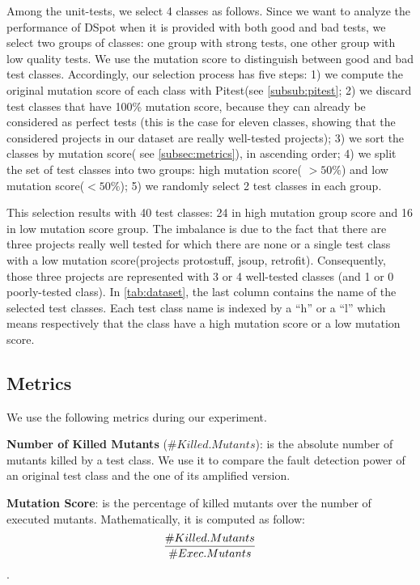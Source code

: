 \documentclass[table,xcdraw,smallextended]{svjour3}
\newcommand{\dspot}{DSpot\xspace}
\newcommand{\pitest}{Pitest\xspace}
\newcommand{\ms}{mutation score\xspace}
\begin{document}
Among the unit-tests, we select 4 classes as follows. Since we want to analyze the performance of \dspot{} when it is provided with both good and bad tests, we select two groups of classes: one group with strong tests, one other group with low quality tests.
We use the \ms to distinguish between good and bad test classes.
Accordingly, our selection process has five steps: 
1) we compute the original \ms of each class with \pitest (see \autoref{subsub:pitest};
2) we discard test classes that have 100\% \ms, because they can already be considered as perfect tests (this is the case for eleven classes, showing that the considered projects in our dataset are really well-tested projects);
3) we sort the classes by \ms ( see \autoref{subsec:metrics}), in ascending order;
4) we split the set of test classes into two groups: high \ms( $> 50\%$) and low \ms  ($< 50\%$);
5) we randomly select 2 test classes in each group.

This selection results with 40 test classes: 24 in high mutation group score and 16 in low \ms group. The imbalance is due to the fact that there are three projects really well tested for which there are none or a single test class with a low \ms (projects protostuff, jsoup, retrofit). Consequently, those three projects are represented with 3 or 4 well-tested classes (and 1 or 0 poorly-tested class). In \autoref{tab:dataset}, the last column contains the name of the selected test classes. Each test class name is indexed by a ``h'' or a ``l'' which means respectively that the class have a high \ms or a low \ms.


\subsection{Metrics}
\label{subsec:metrics}

We use the following metrics during our experiment.


\textbf{Number of Killed Mutants} ($\#Killed.Mutants$): is the absolute number of mutants killed by a test class. We use it to compare the fault detection power of an original test class and the one of its amplified version.

\textbf{Mutation Score}: is the percentage of killed mutants over the number of executed mutants. Mathematically, it is computed as follow:
$$\frac{\#Killed.Mutants}{\#Exec.Mutants} \time 100$$.
\end{document}
